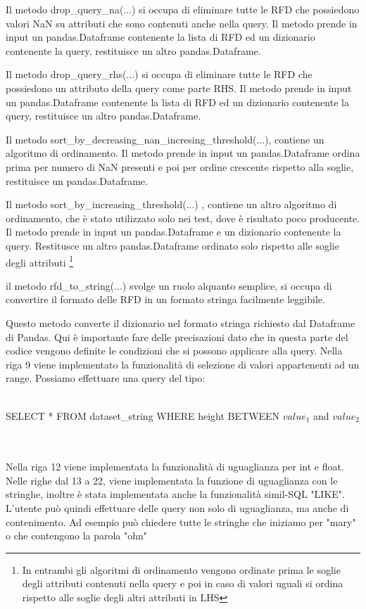Il metodo drop{\_}query{\_}na(...) si occupa di eliminare tutte le RFD che possiedono valori NaN su attributi che sono contenuti anche nella query. Il metodo prende in input un pandas.Dataframe contenente la lista di RFD ed un dizionario contenente la query, restituisce un altro pandas.Dataframe.

Il metodo drop{\_}query{\_}rhs(...) si occupa di eliminare tutte le RFD che possiedono un attributo della query come parte RHS. Il metodo prende in input un pandas.Dataframe contenente la lista di RFD ed un dizionario contenente la query, restituisce un altro pandas.Dataframe.

Il metodo sort{\_}by{\_}decreasing{\_}nan{\_}incresing{\_}threshold(...), contiene un algoritmo di ordinamento. Il metodo prende in input un pandas.Dataframe ordina prima per numero di NaN presenti e poi per ordine crescente rispetto alla soglie, restituisce un pandas.Dataframe.

Il metodo sort{\_}by{\_}increasing{\_}threshold(...) , contiene un altro algoritmo di ordinamento, che è stato utilizzato solo nei test, dove è risultato poco producente. Il metodo prende in input un pandas.Dataframe e un dizionario contenente la query. Restitusce un altro pandas.Dataframe ordinato solo rispetto alle soglie degli attributi \footnote{In entrambi gli algoritmi di ordinamento vengono ordinate prima le soglie degli attributi contenuti nella query e poi in caso di valori uguali si ordina rispetto alle soglie degli altri attributi in LHS}

il metodo rfd{\_}to{\_}string(...) svolge un ruolo alquanto semplice, si occupa di convertire il formato delle RFD in un formato stringa facilmente leggibile.

Questo metodo converte il dizionario nel formato stringa richiesto dal Dataframe di Pandas.
Qui è importante fare delle precisazioni dato che in  questa parte del codice vengono definite le condizioni che si possono applicare alla query.
Nella riga 9 viene implementato la funzionalità di selezione di valori appartenenti ad un range. Possiamo effettuare una query del tipo: \\~\\
\centerline{SELECT * FROM dataset{\_}string WHERE height BETWEEN $value_1$ and $value_2$}
\\~\\
Nella riga 12 viene implementata la funzionalità di uguaglianza per int e float.
Nelle righe dal 13 a 22, viene implementata la funzione di uguaglianza con le stringhe, inoltre è stata implementata anche la funzionalità simil-SQL "LIKE". L'utente può quindi effettuare delle query non solo di uguaglianza, ma anche di contenimento. Ad esempio può chiedere tutte le stringhe che iniziamo per "mary" o che contengono la parola "ohn"

